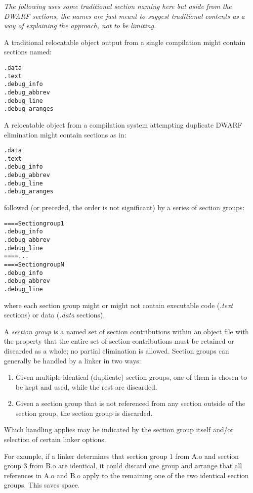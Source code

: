 \textit{The following uses some traditional section naming here
but aside from the DWARF sections, the names are just meant
to suggest traditional contents as a way of explaining the
approach, not to be limiting.}

A traditional relocatable object output 
from a single compilation might contain sections named:
\begin{alltt}
    .data
    .text
    .debug\_info
    .debug\_abbrev
    .debug\_line
    .debug\_aranges
\end{alltt}
A relocatable object from a compilation system 
attempting duplicate DWARF elimination might
contain sections as in:

\begin{alltt}
    .data
    .text
    .debug\_info
    .debug\_abbrev
    .debug\_line
    .debug\_aranges
\end{alltt}

followed (or preceded, the order is not significant) 
by a series of section groups:
\begin{alltt}
==== Section group 1
    .debug\_info
    .debug\_abbrev
    .debug\_line
==== ...
==== Section group N
    .debug\_info
    .debug\_abbrev
    .debug\_line
\end{alltt}

where each section group might or might not contain executable
code (\textit{.text} sections) or data (\textit{.data} sections).

A \textit{section group} is a named set of section contributions
within an object file with the property that the entire set
of section contributions must be retained or discarded as a
whole; no partial elimination is allowed. Section groups can
generally be handled by a linker in two ways:

\begin{enumerate}[1.]
\item Given multiple identical (duplicate) section groups,
one of them is chosen to be kept and used, while the rest
are discarded.

\item Given a section group that is not referenced from any
section outside of the section group, the section group
is discarded.


\end{enumerate}


Which handling applies may be indicated by the section group
itself and/or selection of certain linker options.

For example, if a linker determines that section group 1
from A.o and section group 3 from B.o are identical, it could
discard one group and arrange that all references in A.o and
B.o apply to the remaining one of the two identical section
groups. This saves space.

